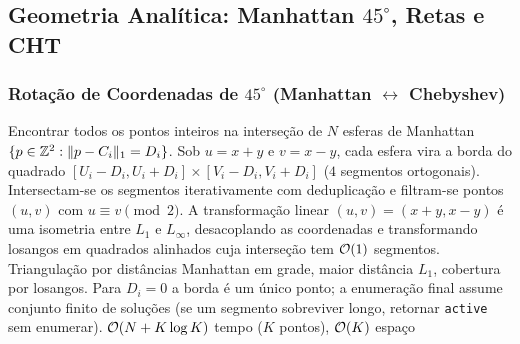 \subsection{Geometria Analítica: Manhattan $45^\circ$, Retas e CHT}

\subsubsection{Rotação de Coordenadas de $45^\circ$ (Manhattan $\leftrightarrow$ Chebyshev)}
\algobox
  {Encontrar todos os pontos inteiros na interseção de $N$ esferas de Manhattan $\{p \in \mathbb{Z}^2 : \|p - C_i\|_1 = D_i\}$.}
  {Sob $u = x + y$ e $v = x - y$, cada esfera vira a borda do quadrado $[U_i - D_i, U_i + D_i] \times [V_i - D_i, V_i + D_i]$ ($4$ segmentos ortogonais). Intersectam-se os segmentos iterativamente com deduplicação e filtram-se pontos $(u, v)$ com $u \equiv v \pmod 2$.}
  {A transformação linear $(u, v) = (x+y, x-y)$ é uma isometria entre $L_1$ e $L_\infty$, desacoplando as coordenadas e transformando losangos em quadrados alinhados cuja interseção tem $\mathcal{O}(1)$ segmentos.}
  {Triangulação por distâncias Manhattan em grade, maior distância $L_1$, cobertura por losangos.}
  {Para $D_i = 0$ a borda é um único ponto; a enumeração final assume conjunto finito de soluções (se um segmento sobreviver longo, retornar \texttt{active} sem enumerar).}
  {$\mathcal{O}(N + K \log K)$ tempo ($K$ pontos), $\mathcal{O}(K)$ espaço}

